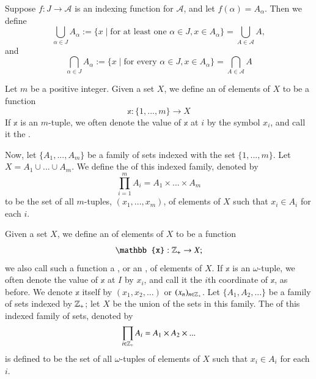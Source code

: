 \documentclass[12pt, a4paper, oneside, openright, titlepage]{book}
\begin{document}
\begin{appendices}
    \begin{defn}
        Suppose $f:J\rightarrow \mathscr{A}$ is an indexing function for $\mathscr{A}$, and let $f(\alpha) = A_{\alpha}$. Then we define \begin{equation*}
            \bigcup\limits_{\alpha \in J}A_{\alpha}:=\{x\;\vert\;\text{for at least one $\alpha \in J, x \in A_{\alpha}$}\} = \bigcup\limits_{A\in \mathscr{A}}A,
        \end{equation*}
        and \begin{equation*}
            \bigcap\limits_{\alpha \in J}A_{\alpha} :=\{x\;\vert\;\text{for every $\alpha \in J, x \in A_{\alpha}$}\} = \bigcap\limits_{A\in\mathscr{A}}A
        \end{equation*}
    \end{defn}


    \begin{defn}
        Let $m$ be a positive integer. Given a set $X$, we define an  of elements of $X$ to be a function \begin{equation*}
            \mathbb{x}:\{1,...,m\}\rightarrow X
        \end{equation*}
        If $\mathbb{x}$ is an $m$-tuple, we often denote the value of $\mathbb{x}$ at $i$ by the symbol $x_i$, and call it the .

        Now, let $\{A_1,...,A_m\}$ be a family of sets indexed with the set $\{1,...,m\}$. Let $X = A_1\cup ... \cup A_m$. We define the  of this indexed family, denoted by \begin{equation*}
            \prod\limits_{i=1}^mA_i = A_1\times ... \times A_m
        \end{equation*}
        to be the set of all $m$-tuples, $(x_1,...,x_m)$, of elements of $X$ such that $x_i \in A_i$ for each $i$.
    \end{defn}

    \begin{defn}
        Given a set $X$, we define an  of elements of $X$ to be a function \begin{equation*}
            \mathbb{x}:\Z_+\rightarrow X;
        \end{equation*}
        we also call such a function a , or an , of elements of $X$. If $\mathbb{x}$ is an $\omega$-tuple, we often denote the value of $\mathbb{x}$ at $I$ by $x_i$, and call it the $i$th coordinate of $\mathbb{x}$, as before. We denote $\mathbb{x}$ itself by $(x_1,x_2,...)$ or $(x_n)_{n\in\mathbb Z_+}$. Let $\{A_1,A_2,...\}$ be a family of sets indexed by $\mathbb Z_+$; let $X$ be the union of the sets in this family. The  of this indexed family of sets, denoted by \begin{equation*}
            \prod\limits_{i\in\mathbb Z_+}A_i = A_1\times A_2 \times ...
        \end{equation*}
        is defined to be the set of all $\omega$-tuples of elements of $X$ such that $x_i \in A_i$ for each $i$.
    \end{defn}


\end{appendices}
\end{document}
